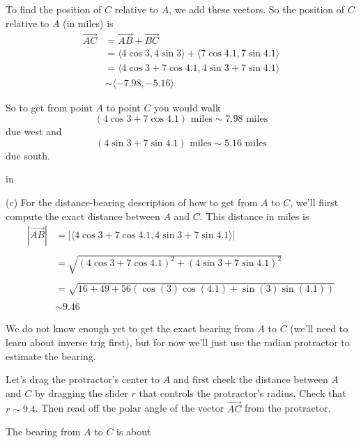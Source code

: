\documentclass{ximera}
\newcommand{\pskip}{\vskip 0.1 in}
\begin{document}
\begin{example}
\begin{explanation}
To find the position of $C$ relative to $A$, we add these vectors. So the position of $C$ relative to $A$ (in miles) is 
\begin{align*}
\overrightarrow{AC} &= \overrightarrow{AB} + \overrightarrow{BC} \\
                              &= \langle 4 \cos 3, 4 \sin 3\rangle + \langle 7 \cos 4.1, 7 \sin 4.1\rangle \\
                              & =    \langle 4 \cos 3 + 7 \cos 4.1 , 4 \sin 3 + 7 \sin  4.1\rangle   \\
                              & \sim \langle  -7.98 ,  -5.16  \rangle 
\end{align*}

So to get from point $A$ to point $C$ you would walk
\[
     (4 \cos 3 + 7 \cos 4.1) \text{  miles} \sim 7.98 \text{ miles} 
\]
due west and 
\[
   (4 \sin 3 + 7 \sin 4.1) \text{  miles} \sim 5.16 \text{ miles} 
\]
due south.

\pskip

(c) For the distance-bearing description of how to get from $A$ to $C$, we'll fiirst compute the exact distance between $A$ and $C$. This distance in miles is
\begin{align*}
   | \overrightarrow{AB}| &= |   \langle 4 \cos 3 + 7 \cos 4.1 , 4 \sin 3 + 7 \sin  4.1\rangle   |   \\ \\
                                   & = \sqrt{( 4 \cos 3 + 7 \cos 4.1)^2 + (4 \sin 3 + 7 \sin  4.1)^2}  \\ \\
                                  & =  \sqrt{16 + 49 + 56 (\cos(3) \cos(4.1) + \sin(3)\sin(4.1))}  \\ \\
                                  & \sim 9.46
\end{align*}

We do not know enough yet to get the exact bearing from $A$ to $C$ (we'll need to learn about inverse trig first), but for now we'll just use the radian protractor to estimate the bearing. 

Let's drag the protractor's center to $A$ and first check the distance between $A$ and $C$ by dragging the slider $r$ that controls the protractor's radius. Check that $r\sim 9.4$. Then read off the polar angle of the vector $\overrightarrow{AC}$ from the protractor. 

\begin{question}  \label{Q43656ff:Motion}
The bearing from $A$ to $C$ is about 
\begin{multipleChoice}  
\end{multipleChoice} 


\end{question}
\end{explanation}
\end{example}
\end{document}
